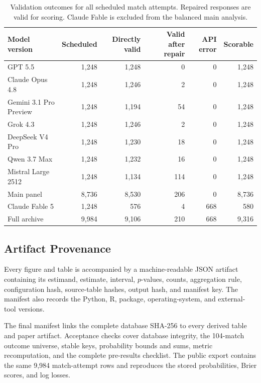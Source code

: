 \documentclass[sigconf,nonacm]{acmart}
\begin{document}
\begin{table}[t]
  \centering
  \caption{Validation outcomes for all scheduled match attempts. Repaired responses are valid for scoring. Claude Fable is excluded from the balanced main analysis.}
  \label{tab:output-validity}
  \small
  \begin{tabular}{lrrrrr}
    \toprule
    \textbf{Model version} & \textbf{Scheduled} & \textbf{Directly valid} & \textbf{Valid after repair} & \textbf{API error} & \textbf{Scorable} \\
    \midrule
    GPT 5.5 & 1,248 & 1,248 & 0 & 0 & 1,248 \\
    Claude Opus 4.8 & 1,248 & 1,246 & 2 & 0 & 1,248 \\
    Gemini 3.1 Pro Preview & 1,248 & 1,194 & 54 & 0 & 1,248 \\
    Grok 4.3 & 1,248 & 1,246 & 2 & 0 & 1,248 \\
    DeepSeek V4 Pro & 1,248 & 1,230 & 18 & 0 & 1,248 \\
    Qwen 3.7 Max & 1,248 & 1,232 & 16 & 0 & 1,248 \\
    Mistral Large 2512 & 1,248 & 1,134 & 114 & 0 & 1,248 \\
    \midrule
    Main panel & 8,736 & 8,530 & 206 & 0 & 8,736 \\
    Claude Fable 5 & 1,248 & 576 & 4 & 668 & 580 \\
    \midrule
    Full archive & 9,984 & 9,106 & 210 & 668 & 9,316 \\
    \bottomrule
  \end{tabular}
\end{table}

\subsection{Artifact Provenance}

Every figure and table is accompanied by a machine-readable JSON artifact containing its estimand, estimate, interval, $p$-values, counts, aggregation rule, configuration hash, source-table hashes, output hash, and manifest key. The manifest also records the Python, R, package, operating-system, and external-tool versions.

The final manifest links the complete database SHA-256 to every derived table and paper artifact. Acceptance checks cover database integrity, the 104-match outcome universe, stable keys, probability bounds and sums, metric recomputation, and the complete pre-results checklist. The public export contains the same 9,984 match-attempt rows and reproduces the stored probabilities, Brier scores, and log losses.
\end{document}
